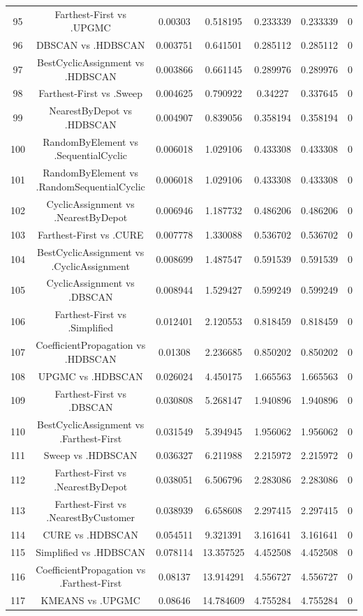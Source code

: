 \documentclass[a4paper,10pt]{article}
\begin{document}
\begin{landscape}
\begin{table}[!htp]
\begin{tabular}{ccccccc}
95&Farthest-First vs .UPGMC&0.00303&0.518195&0.233339&0.233339&0\\
96&DBSCAN vs .HDBSCAN&0.003751&0.641501&0.285112&0.285112&0\\
97&BestCyclicAssignment vs .HDBSCAN&0.003866&0.661145&0.289976&0.289976&0\\
98&Farthest-First vs .Sweep&0.004625&0.790922&0.34227&0.337645&0\\
99&NearestByDepot vs .HDBSCAN&0.004907&0.839056&0.358194&0.358194&0\\
100&RandomByElement vs .SequentialCyclic&0.006018&1.029106&0.433308&0.433308&0\\
101&RandomByElement vs .RandomSequentialCyclic&0.006018&1.029106&0.433308&0.433308&0\\
102&CyclicAssignment vs .NearestByDepot&0.006946&1.187732&0.486206&0.486206&0\\
103&Farthest-First vs .CURE&0.007778&1.330088&0.536702&0.536702&0\\
104&BestCyclicAssignment vs .CyclicAssignment&0.008699&1.487547&0.591539&0.591539&0\\
105&CyclicAssignment vs .DBSCAN&0.008944&1.529427&0.599249&0.599249&0\\
106&Farthest-First vs .Simplified&0.012401&2.120553&0.818459&0.818459&0\\
107&CoefficientPropagation vs .HDBSCAN&0.01308&2.236685&0.850202&0.850202&0\\
108&UPGMC vs .HDBSCAN&0.026024&4.450175&1.665563&1.665563&0\\
109&Farthest-First vs .DBSCAN&0.030808&5.268147&1.940896&1.940896&0\\
110&BestCyclicAssignment vs .Farthest-First&0.031549&5.394945&1.956062&1.956062&0\\
111&Sweep vs .HDBSCAN&0.036327&6.211988&2.215972&2.215972&0\\
112&Farthest-First vs .NearestByDepot&0.038051&6.506796&2.283086&2.283086&0\\
113&Farthest-First vs .NearestByCustomer&0.038939&6.658608&2.297415&2.297415&0\\
114&CURE vs .HDBSCAN&0.054511&9.321391&3.161641&3.161641&0\\
115&Simplified vs .HDBSCAN&0.078114&13.357525&4.452508&4.452508&0\\
116&CoefficientPropagation vs .Farthest-First&0.08137&13.914291&4.556727&4.556727&0\\
117&KMEANS vs .UPGMC&0.08646&14.784609&4.755284&4.755284&0\\

\end{tabular}
\end{table}
\end{landscape}
\end{document}
